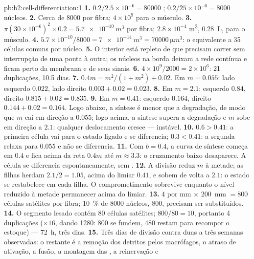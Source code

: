 \begin{solution}{pb:b2:cell-differentiation:1}
\textbf{1.} $0.2/2.5\times 10^{-6} = \num{80000}$ ;
$0.2/25\times 10^{-6} = \num{8000}$ núcleos.
\textbf{2.} Cerca de \num{8000} por fibra; $4\times 10^{9}$ para o
músculo.
\textbf{3.} $\pi(30\times 10^{-6})^{2}\times 0.2 = \qty{5.7e-10}{m^3}$
por fibra; $2.8\times 10^{-4}$ \unit{m^3}, \qty{0.28}{L}, para o
músculo.
\textbf{4.} $5.7\times 10^{-10}/8000 = \qty{7e-14}{m^3} =
\qty{70000}{\micro m^3}$: o equivalente a 35 células comuns por núcleo.
\textbf{5.} O interior está repleto de  que precisam correr
sem interrupção de uma ponta à outra; os núcleos na borda deixam a rede
contínua e ficam perto da membrana e de seus sinais.
\textbf{6.} $4\times 10^{9}/2000 = 2\times 10^{6}$: 21 duplicações,
10.5 dias.
\textbf{7.} $0.4m = m^{2}/(1 + m^{2}) + 0.02$. Em $m = 0.055$: lado
esquerdo $0.022$, lado direito $0.003 + 0.02 = 0.023$.
\textbf{8.} Em $m = 2.1$: esquerdo $0.84$, direito $0.815 + 0.02 = 0.835$.
\textbf{9.} Em $m = 0.41$: esquerdo $0.164$, direito $0.144 + 0.02 = 0.164$.
Logo abaixo, a síntese é menor que a degradação, de modo que $m$ cai
em direção a $0.055$; logo acima, a síntese supera a degradação e $m$
sobe em direção a $2.1$: qualquer deslocamento cresce --- instável.
\textbf{10.} $0.6 > 0.41$: a primeira célula vai para o estado ligado e
se diferencia; $0.3 < 0.41$: a segunda relaxa para $0.055$ e não se
diferencia.
\textbf{11.} Com $b = 0.4$, a curva de síntese começa em $0.4$ e fica
acima da reta $0.4m$ até $m \approx 3.3$: o cruzamento baixo desaparece.
A célula se diferencia espontaneamente, sem .
\textbf{12.} A divisão reduz $m$ à metade; as filhas herdam $2.1/2 =
1.05$, acima do limiar $0.41$, e sobem de volta a $2.1$: o estado se
restabelece em cada filha. O comprometimento sobrevive enquanto o nível
reduzido à metade permanecer acima do limiar.
\textbf{13.} $4$ por mm $\times$ \qty{200}{mm} $= 800$ células satélites
por fibra; \qty{10}{\%} de \num{8000} núcleos, \num{800}, precisam ser
substituídos.
\textbf{14.} O segmento lesado contém $80$ células satélites; $800/80 =
10$, portanto 4 duplicações ($\times 16$, dando \num{1280}: 800 se
fundem, 480 restam para recompor o estoque) --- \qty{72}{h}, três dias.
\textbf{15.} Três dias de divisão contra duas a três semanas
observadas: o restante é a remoção dos detritos pelos macrófagos, o
atraso de ativação, a fusão, a montagem das , a reinervação e

\end{solution}

